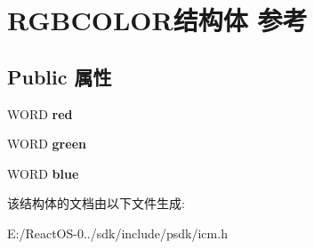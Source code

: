\hypertarget{struct_r_g_b_c_o_l_o_r}{}\section{R\+G\+B\+C\+O\+L\+O\+R结构体 参考}
\label{struct_r_g_b_c_o_l_o_r}
\subsection*{Public 属性}
\begin{DoxyCompactItemize}
\item 
\mbox{\label{struct_r_g_b_c_o_l_o_r_a66700f4649499a940470963d9416e317}} 
W\+O\+RD {\bfseries red}
\item 
\mbox{\label{struct_r_g_b_c_o_l_o_r_a6c99b26014b2a9cdfb079f58e212cd76}} 
W\+O\+RD {\bfseries green}
\item 
\mbox{\label{struct_r_g_b_c_o_l_o_r_a9c5c07d21b9494fa4998450f56df58bc}} 
W\+O\+RD {\bfseries blue}
\end{DoxyCompactItemize}


该结构体的文档由以下文件生成\+:\begin{DoxyCompactItemize}
\item 
E\+:/\+React\+O\+S-\/0../sdk/include/psdk/icm.\+h\end{DoxyCompactItemize}

